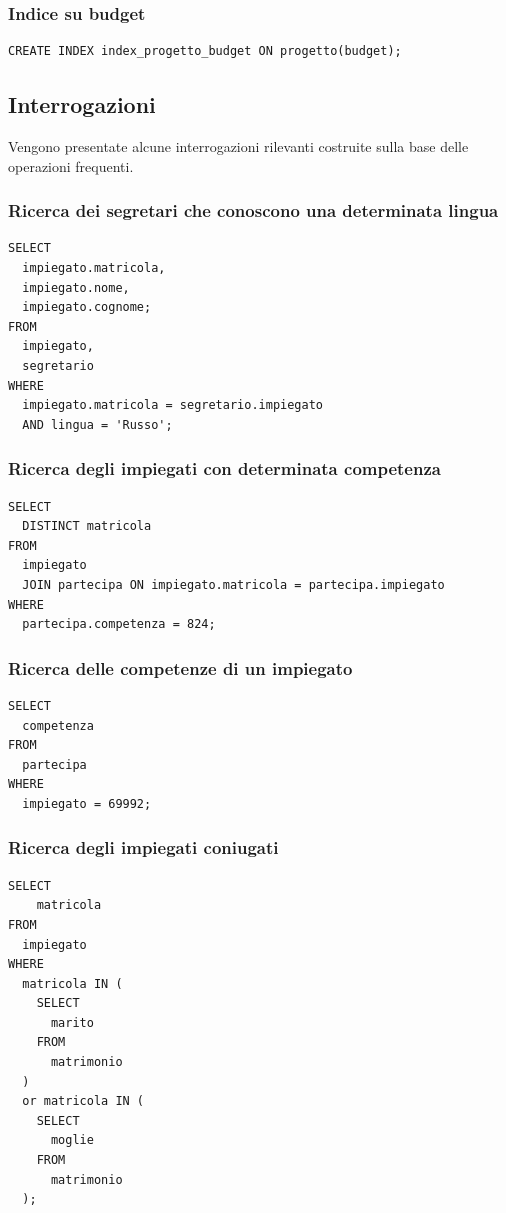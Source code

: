 \documentclass{article}
\begin{document}
\subsubsection{Indice su budget}
\begin{verbatim}
CREATE INDEX index_progetto_budget ON progetto(budget);

\end{verbatim}

\subsection{Interrogazioni}
Vengono presentate alcune interrogazioni rilevanti costruite sulla base delle operazioni frequenti.

\subsubsection{Ricerca dei segretari che conoscono una determinata lingua}
\begin{verbatim}
SELECT 
  impiegato.matricola, 
  impiegato.nome, 
  impiegato.cognome;
FROM 
  impiegato, 
  segretario 
WHERE 
  impiegato.matricola = segretario.impiegato 
  AND lingua = 'Russo';
\end{verbatim}

\subsubsection{Ricerca degli impiegati con determinata competenza}
\begin{verbatim}
SELECT 
  DISTINCT matricola 
FROM 
  impiegato 
  JOIN partecipa ON impiegato.matricola = partecipa.impiegato 
WHERE 
  partecipa.competenza = 824;
\end{verbatim}

\subsubsection{Ricerca delle competenze di un impiegato}
\begin{verbatim}
SELECT 
  competenza 
FROM 
  partecipa 
WHERE 
  impiegato = 69992;
\end{verbatim}

\newpage

\subsubsection{Ricerca degli impiegati coniugati}
\begin{verbatim}
SELECT 
    matricola 
FROM 
  impiegato 
WHERE 
  matricola IN (
    SELECT 
      marito 
    FROM 
      matrimonio
  ) 
  or matricola IN (
    SELECT 
      moglie 
    FROM 
      matrimonio
  );
\end{verbatim}
\end{document}
